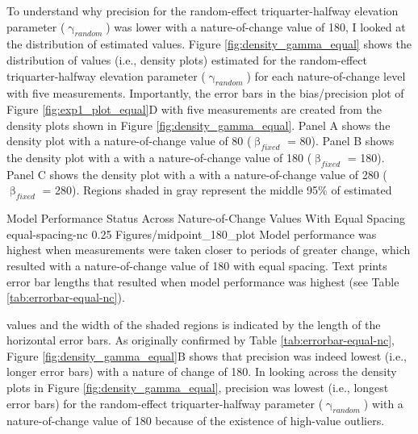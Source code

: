 \documentclass[
12pt, %
twoside,
english]{guelphthesis}
\begin{document}
To understand why precision for the random-effect triquarter-halfway elevation parameter (\(\upgamma_{random}\)) was lower with a nature-of-change value of 180, I looked at the distribution of estimated values. Figure \ref{fig:density_gamma_equal} shows the distribution of values (i.e., density plots) estimated for the random-effect triquarter-halfway elevation parameter (\(\upgamma_{random}\)) for each nature-of-change level with five measurements. Importantly, the error bars in the bias/precision plot of Figure \ref{fig:exp1_plot_equal}D with five measurements are created from the density plots shown in Figure \ref{fig:density_gamma_equal}. Panel A shows the density plot with a nature-of-change value of 80 (\(\upbeta_{fixed}\) = 80). Panel B shows the density plot with a with a nature-of-change value of 180 (\(\upbeta_{fixed}\) = 180). Panel C shows the density plot with a with a nature-of-change value of 280 (\(\upbeta_{fixed}\) = 280). Regions shaded in gray represent the middle 95\% of estimated
\begin{apaFigure}
[portrait]
[samepage]
[0cm]
{Model Performance Status Across Nature-of-Change Values With Equal Spacing}
{equal-spacing-nc}
{0.25}
{Figures/midpoint_180_plot}
{Model performance was highest when measurements were taken closer to periods of greater change, which resulted with a nature-of-change value of 180 with equal spacing. Text prints error bar lengths that resulted when model performance was highest (see Table \ref{tab:errorbar-equal-nc}).}
\end{apaFigure}
\noindent values and the width of the shaded regions is indicated by the length of the horizontal error bars. As originally confirmed by Table \ref{tab:errorbar-equal-nc}, Figure \ref{fig:density_gamma_equal}B shows that precision was indeed lowest (i.e., longer error bars) with a nature of change of 180. In looking across the density plots in Figure \ref{fig:density_gamma_equal}, precision was lowest (i.e., longest error bars) for the random-effect triquarter-halfway parameter (\(\upgamma_{random}\)) with a nature-of-change value of 180 because of the existence of high-value outliers.
\end{document}
